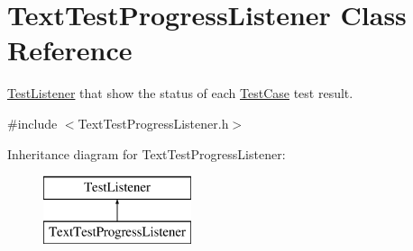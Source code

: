 \hypertarget{class_text_test_progress_listener}{\section{Text\-Test\-Progress\-Listener Class Reference}
\label{class_text_test_progress_listener}
}


\hyperlink{class_test_listener}{Test\-Listener} that show the status of each \hyperlink{class_test_case}{Test\-Case} test result.  




{\ttfamily \#include $<$Text\-Test\-Progress\-Listener.\-h$>$}

Inheritance diagram for Text\-Test\-Progress\-Listener\-:\begin{figure}[H]
\begin{center}
\leavevmode
\includegraphics[height=2.000000cm]{class_text_test_progress_listener}
\end{center}
\end{figure}

